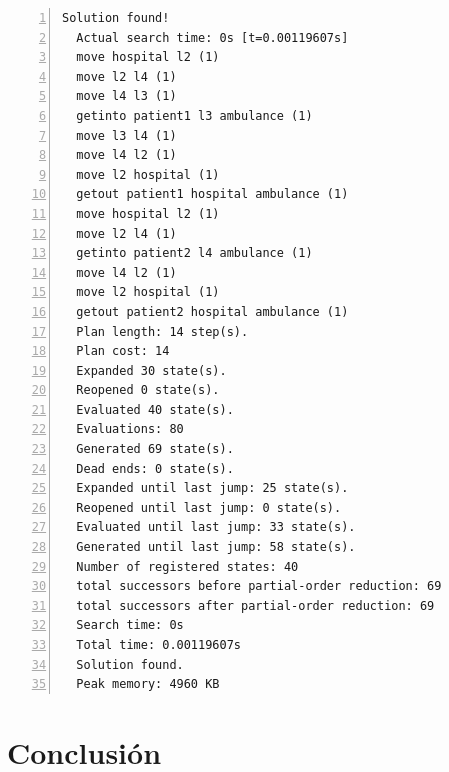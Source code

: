 \documentclass[a4paper,12pt]{article}
\begin{document}




\begin{lstlisting}[style=consola, numbers=left]
  Solution found!
  Actual search time: 0s [t=0.00119607s]
  move hospital l2 (1)
  move l2 l4 (1)
  move l4 l3 (1)
  getinto patient1 l3 ambulance (1)
  move l3 l4 (1)
  move l4 l2 (1)
  move l2 hospital (1)
  getout patient1 hospital ambulance (1)
  move hospital l2 (1)
  move l2 l4 (1)
  getinto patient2 l4 ambulance (1)
  move l4 l2 (1)
  move l2 hospital (1)
  getout patient2 hospital ambulance (1)
  Plan length: 14 step(s).
  Plan cost: 14
  Expanded 30 state(s).
  Reopened 0 state(s).
  Evaluated 40 state(s).
  Evaluations: 80
  Generated 69 state(s).
  Dead ends: 0 state(s).
  Expanded until last jump: 25 state(s).
  Reopened until last jump: 0 state(s).
  Evaluated until last jump: 33 state(s).
  Generated until last jump: 58 state(s).
  Number of registered states: 40
  total successors before partial-order reduction: 69
  total successors after partial-order reduction: 69
  Search time: 0s
  Total time: 0.00119607s
  Solution found.
  Peak memory: 4960 KB
\end{lstlisting}

\section{Conclusión}



\end{document}
